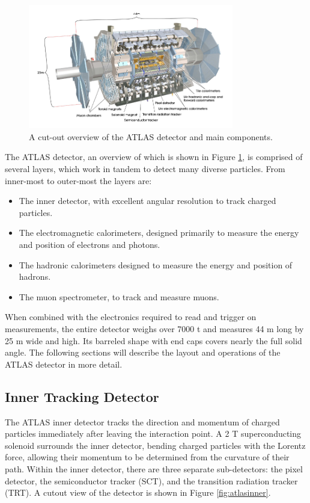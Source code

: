 \begin{figure}[H]
    \centering
    \includegraphics[width=0.8\textwidth]{Figures/2/ATLASDetector.png}
    \caption{A cut-out overview of the ATLAS detector and main components.}
    \label{fig:atlasdec}
\end{figure}

The ATLAS detector, an overview of which is shown in Figure \ref{fig:atlasdec}, is comprised of several layers, which work in tandem to detect many diverse particles. From inner-most to outer-most the layers are:

\begin{itemize}
    \item The inner detector, with excellent angular resolution to track charged particles.
    \item The electromagnetic calorimeters, designed primarily to measure the energy and position of electrons and photons.
    \item The hadronic calorimeters designed to measure the energy and position of hadrons.
    \item The muon spectrometer, to track and measure muons.
\end{itemize}

When combined with the electronics required to read and trigger on measurements, the entire detector weighs over 7000 t and measures 44 m long by 25 m wide and high. Its barreled shape with end caps covers nearly the full solid angle. The following sections will describe the layout and operations of the ATLAS detector in more detail.

\subsection{Inner Tracking Detector}
The ATLAS inner detector tracks the direction and momentum of charged particles immediately after leaving the interaction point. A 2 T superconducting solenoid surrounds the inner detector, bending charged particles with the Lorentz force, allowing their momentum to be determined from the curvature of their path. Within the inner detector, there are three separate sub-detectors: the pixel detector, the semiconductor tracker (SCT), and the transition radiation tracker (TRT). A cutout view of the detector is shown in Figure \ref{fig:atlasinner}.

